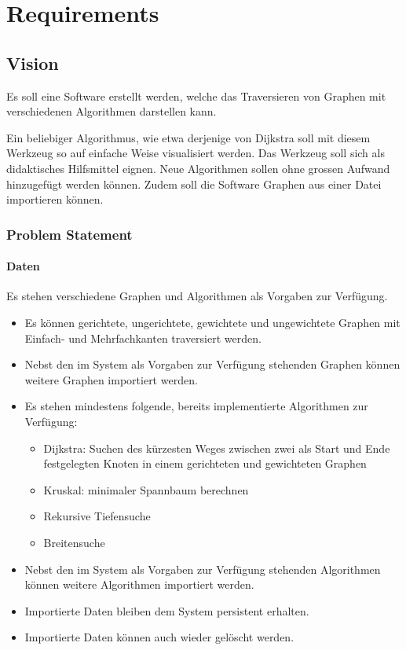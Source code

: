 \newpage		%
\mbox{} 		%
\thispagestyle{empty} 	%
\chapter{Requirements}
% 
\section{Vision}
\label{sec:Vision}
Es soll eine Software erstellt werden, welche das Traversieren von Graphen mit verschiedenen Algorithmen darstellen kann. 

Ein beliebiger Algorithmus, wie etwa derjenige von Dijkstra soll mit diesem Werkzeug so auf einfache Weise visualisiert werden. Das Werkzeug soll sich als didaktisches Hilfsmittel eignen. Neue Algorithmen sollen ohne grossen Aufwand hinzugef\"ugt werden k\"onnen. Zudem soll die Software Graphen aus einer Datei importieren k\"onnen.
% 
\subsection{Problem Statement}
\label{subsec:Problem Statement}
% 
\subsubsection{Daten}
\label{subsubsec:Daten}
Es stehen verschiedene Graphen und Algorithmen als Vorgaben zur Verf\"ugung.
\begin{itemize}
    \item Es k\"onnen gerichtete, ungerichtete, gewichtete und ungewichtete Graphen mit Einfach- und Mehrfachkanten traversiert werden.  
    \item Nebst den im System als Vorgaben zur Verf\"ugung stehenden Graphen k\"onnen weitere Graphen importiert werden.
    \item Es stehen mindestens folgende, bereits implementierte Algorithmen zur Verf\"ugung:
  \begin{itemize}
    \item Dijkstra: Suchen des k\"urzesten Weges zwischen zwei als Start und Ende festgelegten Knoten in einem gerichteten und gewichteten Graphen
    \item Kruskal: minimaler Spannbaum berechnen
    \item Rekursive Tiefensuche
    \item Breitensuche
  \end{itemize}
  \item Nebst den im System als Vorgaben zur Verf\"ugung stehenden Algorithmen k\"onnen weitere Algorithmen importiert werden.
  \item Importierte Daten bleiben dem System persistent erhalten.
  \item Importierte Daten k\"onnen auch wieder gel\"oscht werden.
\end{itemize}
% 
